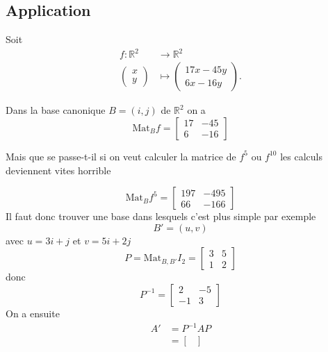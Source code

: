 \documentclass[11pt,colorlinks]{book}
\theoremstyle{mytheoremstyle}
\theoremstyle{mytheoremstyle}
\theoremstyle{mytheoremstyle}
\theoremstyle{mytheoremstyle}
\theoremstyle{mytheoremstyle}
\theoremstyle{mytheoremstyle}
\theoremstyle{mytheoremstyle}
\theoremstyle{mytheoremstyle}
\theoremstyle{myproblemstyle}
\def\mbb#1{\mathbb{#1}}
\def\bR{\mbb{R}}
\newcommand{\vfunc}[5]{
  \begin{align*}
    #1 \colon #2 &\to #3\\
    #4 &\mapsto #5.
  \end{align*}
}
\begin{document}
\subsection{Application}
\begin{ex}
  Soit \vfunc{f}{\bR^2}{\bR^2}{\begin{pmatrix}
    x \\ 
    y
  \end{pmatrix}}{\begin{pmatrix}
    17x - 45y \\ 
    6x - 16y
  \end{pmatrix}}
  Dans la base canonique $B = (i,j)$ de $\bR^2$ on a 
  \begin{equation*}
    \text{Mat}_{B} f = \begin{bmatrix}
      17 & -45 \\ 
      6 & -16
    \end{bmatrix}
  \end{equation*}
  \begin{rmq}
    Mais que se passe-t-il si on veut calculer la matrice de $f^5$ ou $f^{10}$ les calculs deviennent vites horrible
  \end{rmq}
  \begin{equation*}
    \text{Mat}_{B} f^5 = \begin{bmatrix}
      197 & -495 \\ 
      66 & -166
    \end{bmatrix}
  \end{equation*}
  Il faut donc trouver une base dans lesquels c'est plus simple par exemple 
  \begin{equation*}
    B' = (u,v)
  \end{equation*}
  avec $u = 3i + j$ et $v = 5i + 2j$
  \begin{equation*}
    P = \text{Mat}_{B,B'} I_2 = \begin{bmatrix}
      3 & 5 \\ 
      1 & 2
    \end{bmatrix}
  \end{equation*}
  donc 
  \begin{equation*}
    P^{-1} = \begin{bmatrix}
      2 & -5 \\ 
      -1 & 3
    \end{bmatrix}
  \end{equation*}
  On a ensuite 
  \begin{align*}
    A' &= P^{-1} A P \\ 
       &= \begin{bmatrix}

\end{bmatrix}
\end{align*}
\end{ex}
\end{document}
